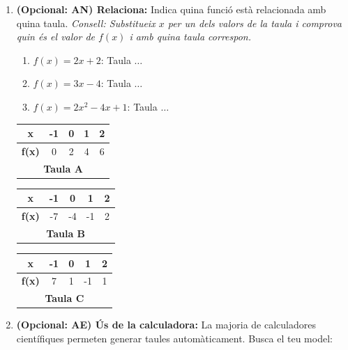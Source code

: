 \documentclass[12pt,a4paper]{article}
\begin{document}
\begin{enumerate}[leftmargin=*, label=\textbf{\arabic*.}]
    \item \textbf{(Opcional: AN) Relaciona:} Indica quina funció està relacionada amb quina taula.
    \textit{Consell: Substitueix $x$ per un dels valors de la taula i comprova quin és el valor de $f(x)$ i amb quina taula correspon.}
    
    \begin{enumerate}[label=\alph*)]
        \item $f(x) = 2x + 2$: Taula $\dots$
        \item $f(x) = 3x - 4$: Taula $\dots$
        \item $f(x) = 2x^2 - 4x + 1$: Taula $\dots$
    \end{enumerate}

    \vspace{0.2cm}
    \begin{center}
    \renewcommand{\arraystretch}{1.3}
    \small %
    \begin{tabular}{|c|c|c|c|c|}
        \hline
        \textbf{x} & -1 & 0 & 1 & 2 \\ \hline
        \textbf{f(x)} & 0 & 2 & 4 & 6 \\ \hline
        \multicolumn{5}{c}{\textbf{Taula A}}
    \end{tabular}
    \hfill %
    \begin{tabular}{|c|c|c|c|c|}
        \hline
        \textbf{x} & -1 & 0 & 1 & 2 \\ \hline
        \textbf{f(x)} & -7 & -4 & -1 & 2 \\ \hline
        \multicolumn{5}{c}{\textbf{Taula B}}
    \end{tabular}
    \hfill
    \begin{tabular}{|c|c|c|c|c|}
        \hline
        \textbf{x} & -1 & 0 & 1 & 2 \\ \hline
        \textbf{f(x)} & 7 & 1 & -1 & 1 \\ \hline
        \multicolumn{5}{c}{\textbf{Taula C}}
    \end{tabular}
    \end{center}

    \item \textbf{(Opcional: AE) Ús de la calculadora:} La majoria de calculadores científiques permeten generar taules automàticament. Busca el teu model:
    

\end{enumerate}
\end{document}
